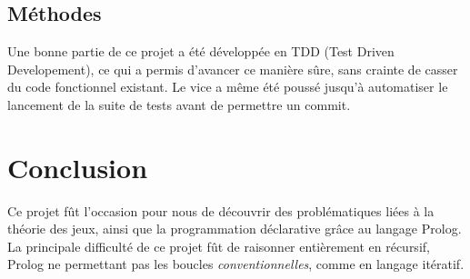 \documentclass[a4paper,12pt]{article}
\begin{document}
\subsection{Méthodes}
Une bonne partie de ce projet a été développée en TDD (Test Driven Developement), ce qui a permis d'avancer ce manière sûre, sans crainte de casser du code fonctionnel existant. Le vice a même été poussé jusqu'à automatiser le lancement de la suite de tests avant de permettre un commit.

\section{Conclusion}
Ce projet fût l'occasion pour nous de découvrir des problématiques liées à la théorie des jeux, ainsi que la programmation déclarative grâce au langage Prolog. La principale difficulté de ce projet fût de raisonner entièrement en récursif, Prolog ne permettant pas les boucles \emph{conventionnelles}, comme en langage itératif.
\end{document}
